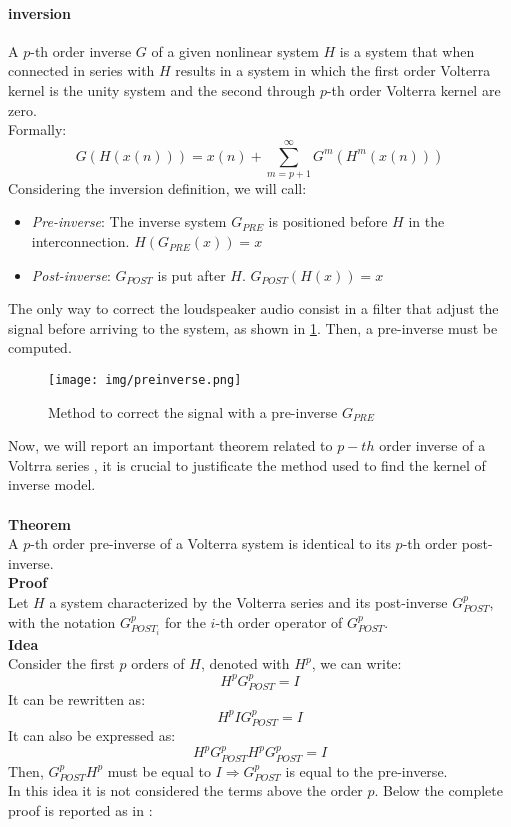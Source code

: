 \paragraph{inversion} A $p$-th order inverse $G$ of a given nonlinear system $H$ is a system that when connected in series with $H$ results in a system in which the first order Volterra kernel is the unity system and the second through $p$-th order Volterra kernel are zero.\\
Formally:
\begin{equation}
G(H(x(n))) = x(n) + \sum_{m=p+1}^{\infty} G^m(H^m(x(n)))
\end{equation}
Considering the inversion definition, we will call:
\begin{itemize}
\item \textit{Pre-inverse}: The inverse system $G_{PRE}$ is positioned before $H$ in the interconnection.  $H(G_{PRE}(x))=x$
\item \textit{Post-inverse}: $G_{POST}$ is put after $H$. $G_{POST}(H(x))=x$
\end{itemize}
The only way to correct the loudspeaker audio consist in a filter that adjust the signal before arriving to the system, as shown in \ref{fig:preinverse}. Then, a pre-inverse must be computed.
\begin{figure}[h]\centering
\texttt{[image: img/preinverse.png]} 
\caption{Method to correct the signal with a pre-inverse $G_{PRE}$} \label{fig:preinverse}
\end{figure}
Now, we will report an important theorem related to $p-th$ order inverse of a Voltrra series \cite{preinverse}, it is crucial to justificate the method used to find the kernel of inverse model.\\\\
\textbf{Theorem}\\
A $p$-th order pre-inverse of a Volterra system is identical to its $p$-th order post-inverse.\\
\textbf{Proof}\\
Let $H$ a system characterized by the Volterra series and its post-inverse $G_{POST}^p$, with the notation $G_{POST_i}^p$ for the $i$-th order operator of $G_{POST}^p$.\\
\textbf{Idea}\\
Consider the first $p$ orders of $H$, denoted with $H^p$, we can write:
\[H^p G_{POST}^p = I \]
It can be rewritten as:
\[H^p I G_{POST}^p = I \]
It can also be expressed as:
\[ H^p G_{POST}^p H^p G_{POST}^p = I \]
Then, $G_{POST}^p H^p$ must be equal to $I \Rightarrow G_{POST}^p$ is equal to the pre-inverse.\\
In this idea it is not considered the terms above the order $p$. Below the complete proof is reported as in \cite{preinverse}:\\\\


